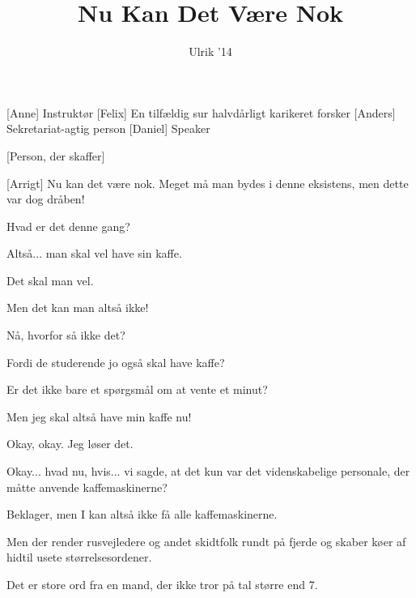 \documentclass[a4paper,11pt]{article}
\title{Nu Kan Det Være Nok}
\author{Ulrik '14}
\begin{document}
\maketitle

\begin{roles}
[Anne] Instruktør
[Felix] En tilfældig sur halvdårligt karikeret forsker
[Anders] Sekretariat-agtig person
[Daniel] Speaker
\end{roles}

\begin{props}
[Person, der skaffer]
\end{props}

\begin{sketch}


[Arrigt] Nu kan det være nok. Meget må man bydes i denne eksistens, men dette var dog dråben!


 Hvad er det denne gang?

 Altså... man skal vel have sin kaffe.

 Det skal man vel.

 Men det kan man altså ikke!

 Nå, hvorfor så ikke det?

 Fordi de studerende jo også skal have kaffe?

 Er det ikke bare et spørgsmål om at vente et minut?

 Men jeg skal altså have min kaffe nu!

 Okay, okay. Jeg løser det.


 Okay... hvad nu, hvis... vi sagde, at det kun var det videnskabelige personale, der måtte anvende kaffemaskinerne?

 Beklager, men I kan altså ikke få alle kaffemaskinerne.

 Men der render rusvejledere og andet skidtfolk rundt på fjerde og skaber køer af hidtil usete størrelsesordener.

 Det er store ord fra en mand, der ikke tror på tal større end 7.


\end{sketch}
\end{document}
